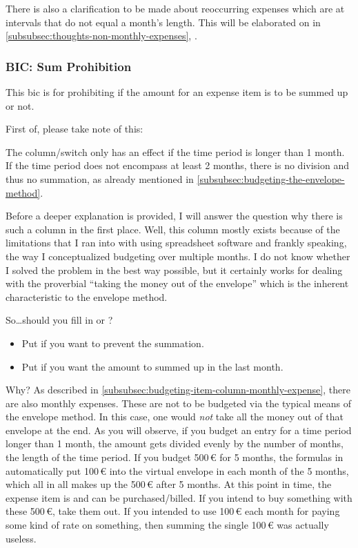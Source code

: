There is also a clarification to be made about reoccurring expenses which are at intervals that do not equal a month's length.
This will be elaborated on in \autoref{subsubsec:thoughts-non-monthly-expenses}, .

\subsubsection{BIC: Sum Prohibition}
\label{subsubsec:budgeting-item-column-sum-prohibition}

This \ac{bic} is for prohibiting if the amount for an expense item is to be summed up or not.

First of, please take note of this:
\begin{specialnote}
	The column/switch  only has an effect if the time period is longer than 1 month.
	If the time period does not encompass at least 2 months, there is no division and thus no summation, as already mentioned in \autoref{subsubsec:budgeting-the-envelope-method}.
\end{specialnote}

Before a deeper explanation is provided, I will answer the question why there is such a column in the first place.
Well, this column mostly exists because of the limitations that I ran into with using spreadsheet software and frankly speaking, the way I conceptualized budgeting over multiple months.
I do not know whether I solved the problem in the best way possible, but it certainly works for dealing with the proverbial ``taking the money out of the envelope'' which is the inherent characteristic to the envelope method.

So\ldots should you fill in  or ?
\begin{itemize}
	\item Put  if you want to prevent the summation.
	\item Put  if you want the amount to summed up in the last month.
\end{itemize}

Why?
As described in \autoref{subsubsec:budgeting-item-column-monthly-expense}, there are also monthly expenses.
These are not to be budgeted via the typical means of the envelope method.
In this case, one would \emph{not} take all the money out of that envelope at the end.
As you will observe, if you budget an entry for a time period longer than 1 month, the amount gets divided evenly by the number of months, \ie the length of the time period.
If you budget 500\,€ for 5 months, the formulas in \tfn automatically put 100\,€ into the virtual envelope in each month of the 5 months, which all in all makes up the 500\,€ after 5 months.
At this point in time, the expense item is  and can be purchased/billed.
If you intend to buy something with these 500\,€, take them out.
If you intended to use 100\,€ each month for paying some kind of rate on something, then summing the single 100\,€ was actually useless.

